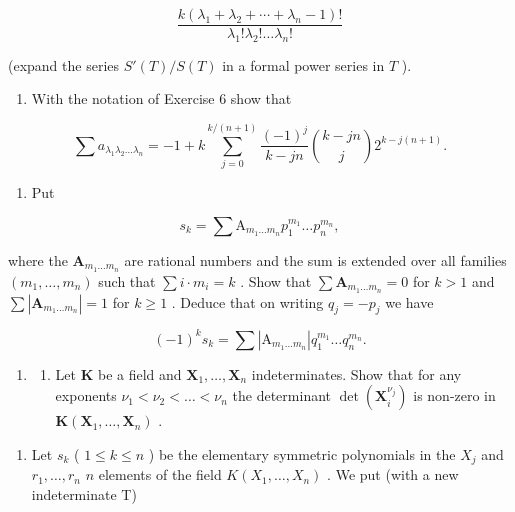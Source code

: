 \[
\frac {k \left(\lambda_ {1} + \lambda_ {2} + \cdots + \lambda_ {n} - 1\right) !}{\lambda_ {1} ! \lambda_ {2} ! \dots \lambda_ {n} !}
\]

(expand the series \(S'(T) / S(T)\) in a formal power series in \(T\) ).

\begin{enumerate}
\def\labelenumi{\arabic{enumi})}
\setcounter{enumi}{6}
\tightlist
\item
  With the notation of Exercise 6 show that
\end{enumerate}

\[
\sum a _ {\lambda_ {1} \lambda_ {2} \dots \lambda_ {n}} = - 1 + k \sum_ {j = 0} ^ {k / (n + 1)} \frac {(- 1) ^ {j}}{k - j n} \binom {k - j n} {j} 2 ^ {k - j (n + 1)}.
\]

\begin{enumerate}
\def\labelenumi{\arabic{enumi})}
\setcounter{enumi}{7}
\tightlist
\item
  Put
\end{enumerate}

\[
s _ {k} = \sum \mathrm{A} _ {m _ {1} \dots m _ {n}} p _ {1} ^ {m _ {1}} \dots p _ {n} ^ {m _ {n}},
\]

where the \(\mathbf{A}_{m_1\dots m_n}\) are rational numbers and the sum is extended over all families \((m_1,\dots,m_n)\) such that \(\sum i\cdot m_i = k\) . Show that \(\sum \mathbf{A}_{m_1\dots m_n} = 0\) for \(k > 1\) and \(\sum |\mathbf{A}_{m_1\dots m_n}| = 1\) for \(k\geqslant 1\) . Deduce that on writing \(q_{j} = -p_{j}\) we have

\[
(- 1) ^ {k} s _ {k} = \sum \left| \mathrm{A} _ {m _ {1} \dots m _ {n}} \right| q _ {1} ^ {m _ {1}} \dots q _ {n} ^ {m _ {n}}.
\]

\begin{enumerate}
\def\labelenumi{\arabic{enumi})}
\setcounter{enumi}{8}
\tightlist
\item
  \begin{enumerate}
  \def\labelenumii{\alph{enumii})}
  \tightlist
  \item
    Let \(\mathbf{K}\) be a field and \(\mathbf{X}_1, \ldots, \mathbf{X}_n\) indeterminates. Show that for any exponents \(\nu_1 < \nu_2 < \ldots < \nu_n\) the determinant \(\det(\mathbf{X}_i^{\nu_j})\) is non-zero in \(\mathbf{K}(\mathbf{X}_1, \ldots, \mathbf{X}_n)\) .
  \end{enumerate}
\end{enumerate}

\begin{enumerate}
\def\labelenumi{\alph{enumi})}
\setcounter{enumi}{1}
\tightlist
\item
  Let \(s_k\) ( \(1 \leqslant k \leqslant n\) ) be the elementary symmetric polynomials in the \(X_j\) and \(r_1, \ldots, r_n\) \(n\) elements of the field \(K(X_1, \ldots, X_n)\) . We put (with a new indeterminate T)
\end{enumerate}

